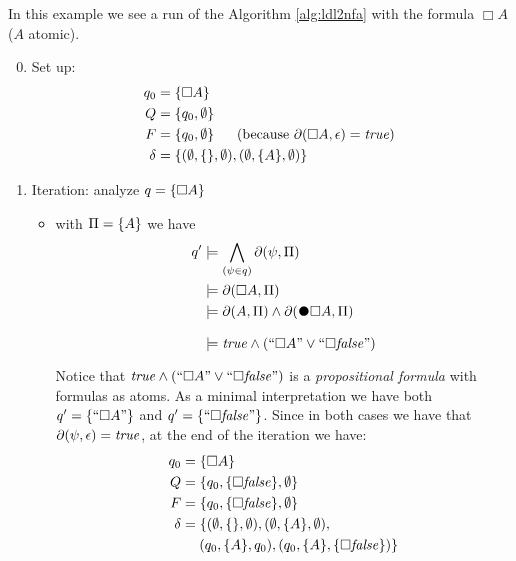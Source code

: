 \begin{example}\label{ldl2nfa-example-always}
	In this example we see a run of the Algorithm \ref{alg:ldl2nfa} with the \LTLf formula $\Box A$ ($A$ atomic).
	\begin{enumerate}
		 \setcounter{enumi}{-1}
		 \item Set up:
		 \begin{align*}
			 q_0 &= \{\Box A\}		\\
			 Q &= \{q_0, \emptyset\}  \\
			 F &= \{q_0, \emptyset\}  \hspace*{.18in} \ \text{(because $\partial\lparen \Box A, \epsilon\rparen=\mathit{true}$)}\ \\
			 \delta &= \{(\emptyset, \{\}, \emptyset), (\emptyset, \{A\}, \emptyset)\}
		 \end{align*}
		\item Iteration: analyze $q = \{\Box A\}$
		\begin{itemize}
			\item with $\Pi = \{A\}$ we have 
			\begin{align*}
				q' &\models \bigwedge_{(\psi\in q)} \Dfun{\psi}\\
				   &\models \Dfun{\Box A}\\
				   &\models \Dfun{A} \lAND \Dfun{\Wnext \Box A}\\
				   &\models \true \lAND (``\Box A" \lOR ``\Box \false")
			\end{align*}
			Notice that $\mathit{true} \wedge (``\Box A" \vee ``\Box \mathit{false}")$ is a \emph{propositional formula} with \LTLf formulas as atoms.
			As a minimal interpretation we have both $q' = \{``\Box A"\}$ and $q' = \{``\Box \mathit{false}"\}$.
			Since in both cases we have that $\partial\lparen \psi, \epsilon\rparen=\mathit{true}$, at the end of the iteration we have:
			\begin{align*}
				q_0 &= \{\Box A\}		\\
				Q &= \{q_0, \{\Box \mathit{false}\}, \emptyset\}  \\
				F &= \{q_0, \{\Box \mathit{false}\}, \emptyset\}  \\
				\delta &= \{(\emptyset, \{\}, \emptyset), (\emptyset, \{A\}, \emptyset), \\
				&\hspace*{.18in} (q_0, \{A\}, q_0), (q_0, \{A\}, \{\Box \mathit{false}\})\}
			\end{align*}
			

\end{itemize}
\end{enumerate}
\end{example}
